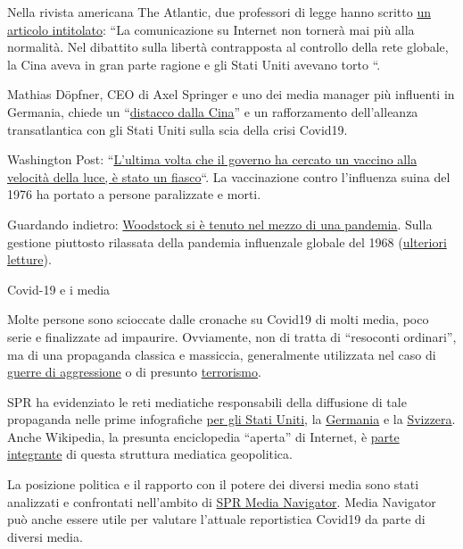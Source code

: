 Nella rivista americana The Atlantic, due professori di legge hanno
scritto
\href{https://www.theatlantic.com/ideas/archive/2020/04/what-covid-revealed-about-internet/610549/}{un
articolo intitolato}: ``La comunicazione su Internet non tornerà mai più
alla normalità. Nel dibattito sulla libertà contrapposta al controllo
della rete globale, la Cina aveva in gran parte ragione e gli Stati
Uniti avevano torto ``.

Mathias Döpfner, CEO di Axel Springer e uno dei media manager più
influenti in Germania, chiede un
``\href{https://www.german-foreign-policy.com/news/detail/8263/}{distacco
dalla Cina}'' e un rafforzamento dell'alleanza transatlantica con gli
Stati Uniti sulla scia della crisi Covid19.

Washington Post:
``\href{https://www.washingtonpost.com/history/2020/05/01/vaccine-swine-flu-coronavirus/}{L'ultima
volta che il governo ha cercato un vaccino alla velocità della luce, è
stato un fiasco}``. La vaccinazione contro l'influenza suina del 1976 ha
portato a persone paralizzate e morti.

Guardando indietro:
\href{https://www.aier.org/article/woodstock-occurred-in-the-middle-of-a-pandemic/}{Woodstock
si è tenuto nel mezzo di una pandemia}. Sulla gestione piuttosto
rilassata della pandemia influenzale globale del 1968
(\href{https://www.britannica.com/event/Hong-Kong-flu-of-1968}{ulteriori
letture}).

Covid-19 e i media

Molte persone sono scioccate dalle cronache su Covid19 di molti media,
poco serie e finalizzate ad impaurire. Ovviamente, non di tratta di
``resoconti ordinari'', ma di una propaganda classica e massiccia,
generalmente utilizzata nel caso di
\href{https://swprs.org/propaganda-in-the-war-on-yugoslavia/}{guerre di
aggressione} o di presunto
\href{https://www.motherjones.com/politics/2013/01/terror-factory-fbi-trevor-aaronson-book/}{terrorismo}.

SPR ha evidenziato le reti mediatiche responsabili della diffusione di
tale propaganda nelle prime infografiche
\href{https://swprs.org/the-american-empire-and-its-media/}{per gli
Stati Uniti}, la
\href{https://swprs.org/netzwerk-medien-deutschland/}{Germania} e la
\href{https://swprs.org/netzwerk-medien-schweiz/}{Svizzera}. Anche
Wikipedia, la presunta enciclopedia ``aperta'' di Internet, è
\href{https://swprs.org/wikipedia-disinformation-operation/}{parte
integrante} di questa struttura mediatica geopolitica.

La posizione politica e il rapporto con il potere dei diversi media sono
stati analizzati e confrontati nell'ambito di
\href{https://swprs.org/media-navigator/}{SPR Media Navigator}. Media
Navigator può anche essere utile per valutare l'attuale reportistica
Covid19 da parte di diversi media.


